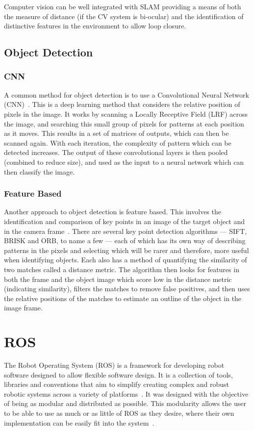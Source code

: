 Computer vision can be well integrated with SLAM providing a means of both the measure
of distance (if the CV system is bi-ocular) and the identification of distinctive
features in the environment to allow loop closure\cite{CVho2006loop}.
\subsection{Object Detection}\label{litreview/cv/objDet}
\subsubsection{CNN}\label{litreview/cv/objDet/CNN}
A common method for object detection is to use a Convolutional
Neural Network (CNN)~\cite{schmidhuber2015deep}. This is a deep learning method that
considers the relative position of pixels in the image. It
works by scanning a Locally Receptive Field (LRF) across the
image, and searching this small group of pixels for patterns
at each position as it moves. This results in a set of
matrices of outputs, which can then be scanned again. With
each iteration, the complexity of pattern which can be detected
increases. The output of these convolutional layers is then
pooled (combined to reduce size), and used as the input to a
neural network which can then classify the image.


\subsubsection{Feature Based}\label{litreview/cv/objDet/fb}
Another approach to object detection is feature based. This
involves the identification and comparison of key points in an
image of the target object and in the camera frame~\cite{lowe2004distinctive}. There are
several key point detection algorithms --- SIFT, BRISK and ORB,
to name a few --- each of which has its own way of describing
patterns in the pixels and selecting which will be rarer and
therefore, more useful when identifying objects. Each also has
a method of quantifying the similarity of two matches called a
distance metric. The algorithm then looks for features in both
the frame and the object image which score low in the distance
metric (indicating similarity), filters the matches to remove
false positives, and then uses the relative positions of the
matches to estimate an outline of the object in the image
frame.

\section{ROS}\label{litreview/ROS}
The Robot Operating System (ROS) is a framework for developing robot
software designed to allow flexible software design. It is a collection of tools,
libraries and conventions that aim to simplify creating complex and robust robotic systems across a variety of platforms~\cite{aboutROS}.
It was designed with the objective of being as modular and distributed
as possible. This modularity allows the user to be able to use as much or
as little of ROS as they desire, where their own implementation can be
easily fit into the system~\cite{rosForMe}.

